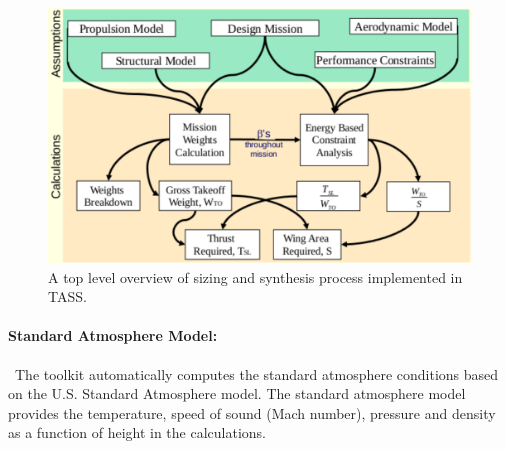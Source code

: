 \documentclass[pdftex,11pt,letter]{article}
\begin{document}
\begin{figure}[h!]
	\centering
	\includegraphics[scale=0.85]{figures/sizing_overview.pdf}
	\caption{A top level overview of sizing and synthesis process implemented in TASS\cite{MavrisNotes}.}
	\label{fig:sizing_overview}
\end{figure}

\paragraph{Standard Atmosphere Model:}~The toolkit automatically computes the standard atmosphere conditions based on the U.S. Standard Atmosphere model\cite{US,sky}.  The standard atmosphere model provides the temperature, speed of sound (Mach number), pressure and density as a function of height in the calculations.
\end{document}
